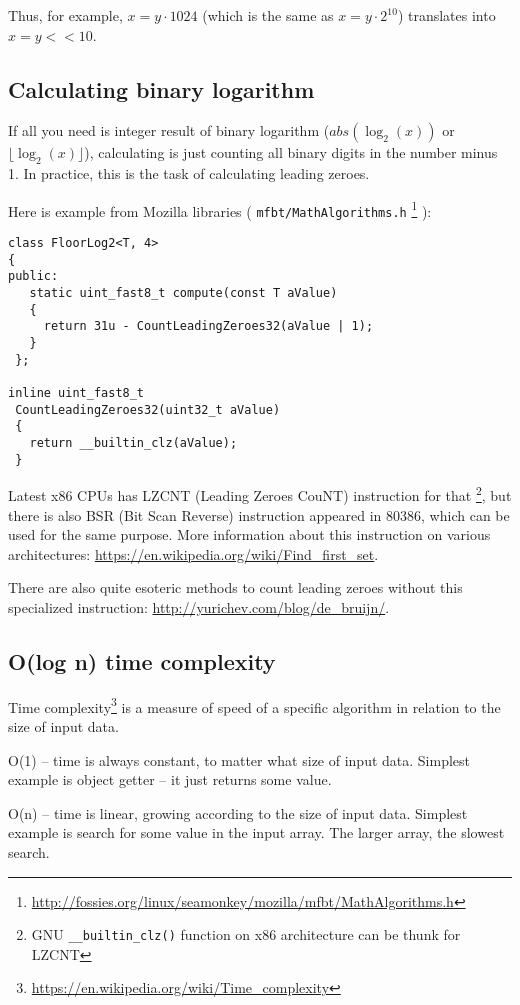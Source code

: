 Thus, for example, $x=y \cdot 1024$ (which is the same as $x=y \cdot 2^{10}$) translates into $x=y<<10$.

\subsection{Calculating binary logarithm}

If all you need is integer result of binary logarithm ($abs(\log_2(x))$ or $\lfloor \log_2(x) \rfloor$), 
calculating is just counting all binary digits in the number minus 1.
In practice, this is the task of calculating leading zeroes.

Here is example from Mozilla libraries ( \texttt{mfbt/MathAlgorithms.h}
\footnote{\url{http://fossies.org/linux/seamonkey/mozilla/mfbt/MathAlgorithms.h}} ):

\begin{lstlisting}[caption=Mozilla libraries]
class FloorLog2<T, 4>
{
public:
   static uint_fast8_t compute(const T aValue)
   {
     return 31u - CountLeadingZeroes32(aValue | 1);
   }
 };

inline uint_fast8_t
 CountLeadingZeroes32(uint32_t aValue)
 {
   return __builtin_clz(aValue);
 }
\end{lstlisting}

Latest x86 CPUs has LZCNT (Leading Zeroes CouNT) instruction for that
\footnote{GNU \texttt{\_\_builtin\_clz()} function on x86 architecture can be thunk for LZCNT}, 
but there is also BSR (Bit Scan Reverse) instruction appeared in 80386, which can be used for the same purpose.
More information about this instruction on various architectures: \url{https://en.wikipedia.org/wiki/Find_first_set}.

There are also quite esoteric methods to count leading zeroes without this specialized instruction: \url{http://yurichev.com/blog/de_bruijn/}.

\subsection{O(log n) time complexity}

Time complexity\footnote{\url{https://en.wikipedia.org/wiki/Time_complexity}} is a measure of speed of a specific algorithm 
in relation to the size of input data.

O(1) -- time is always constant, to matter what size of input data. Simplest example is object getter -- it just returns some value.

O(n) -- time is linear, growing according to the size of input data. Simplest example is search for some value in the input array.
The larger array, the slowest search.

